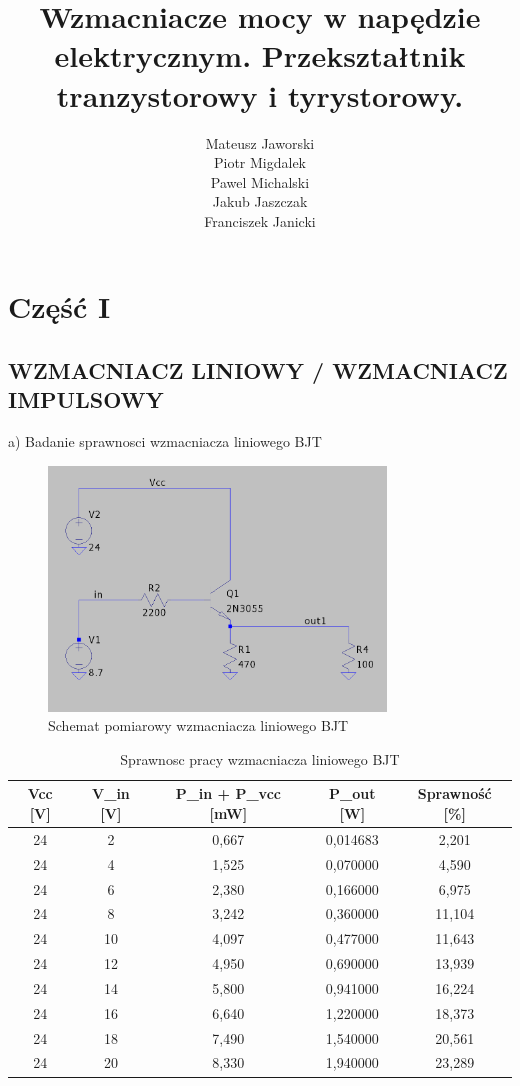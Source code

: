 \documentclass[11pt]{article}
\title{Wzmacniacze mocy w napędzie elektrycznym. Przekształtnik tranzystorowy i tyrystorowy.}
\author{
  Mateusz Jaworski \\
  Piotr Migdalek \\
  Pawel Michalski \\
  Jakub Jaszczak \\
  Franciszek Janicki
}
\begin{document}
\maketitle

\section{Część I}

\subsection{WZMACNIACZ LINIOWY / WZMACNIACZ IMPULSOWY}

a) Badanie sprawnosci wzmacniacza liniowego BJT

\begin{figure}[H]
\centering
\includegraphics[width=0.8\textwidth]{aun1_liniowy_bjt.png}
\caption{Schemat pomiarowy wzmacniacza liniowego BJT}
\end{figure}

\begin{table}[H]
\centering
\begin{tabular}{|c|c|c|c|c|}
\hline
\textbf{Vcc [V]} & \textbf{V\_in [V]} & \textbf{P\_in + P\_vcc [mW]} & \textbf{P\_out [W]} & \textbf{Sprawność [\%]} \\
\hline
24 & 2  & 0{,}667  & 0{,}014683 & 2{,}201 \\
\hline
24 & 4  & 1{,}525  & 0{,}070000 & 4{,}590 \\
\hline
24 & 6  & 2{,}380  & 0{,}166000 & 6{,}975 \\
\hline
24 & 8  & 3{,}242  & 0{,}360000 & 11{,}104 \\
\hline
24 & 10 & 4{,}097  & 0{,}477000 & 11{,}643 \\
\hline
24 & 12 & 4{,}950  & 0{,}690000 & 13{,}939 \\
\hline
24 & 14 & 5{,}800  & 0{,}941000 & 16{,}224 \\
\hline
24 & 16 & 6{,}640  & 1{,}220000 & 18{,}373 \\
\hline
24 & 18 & 7{,}490  & 1{,}540000 & 20{,}561 \\
\hline
24 & 20 & 8{,}330  & 1{,}940000 & 23{,}289 \\
\hline
\end{tabular}
\caption{Sprawnosc pracy wzmacniacza liniowego BJT}
\end{table}
\end{document}
